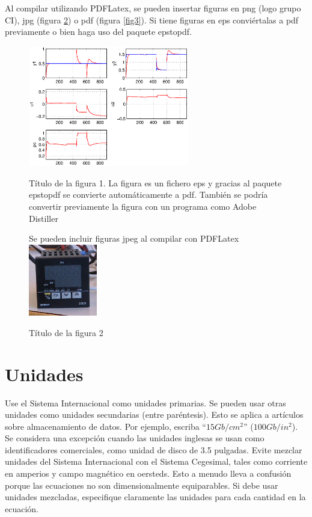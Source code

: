 \documentclass[5p,times,authoryear]{elsarticle}
\begin{document}
Al compilar utilizando PDFLatex, se pueden insertar figuras en png (logo grupo CI), jpg (figura \ref{fig2}) o pdf (figura \ref{fig3}). Si tiene figuras en eps conviértalas a pdf previamente o bien haga uso del paquete epstopdf.


\begin{figure}
\centering
  \includegraphics[width=7cm]{Figuras/figuraeps}\\
  \caption{Título de la figura 1. La figura es un fichero eps y gracias al paquete epstopdf se convierte automáticamente a pdf. También se podría convertir previamente la figura con un programa como Adobe Distiller}\label{fig1}
\end{figure}

\begin{figure}
\centering
   Se pueden incluir figuras jpeg al compilar con PDFLatex
  \includegraphics[width=3cm]{Figuras/figurajpeg}\\
  \caption{Título de la figura 2}\label{fig2}
\end{figure}


\section{Unidades}

Use el Sistema Internacional como unidades primarias. Se pueden usar otras unidades como unidades secundarias (entre paréntesis). Esto se aplica a artículos sobre almacenamiento de datos. Por ejemplo, escriba ``$15 Gb/cm^2$'' ($100 Gb/in^2$). Se considera una excepción cuando las unidades inglesas se usan como identificadores comerciales, como unidad de disco de 3.5 pulgadas. Evite mezclar unidades del Sistema Internacional con el Sistema Cegesimal, tales como corriente en amperios y campo magnético en  oersteds. Esto a menudo lleva a confusión porque las ecuaciones no son dimensionalmente equiparables. Si debe usar unidades mezcladas, especifique claramente las unidades para cada cantidad  en la ecuación. \citep{Able1945}
\end{document}
